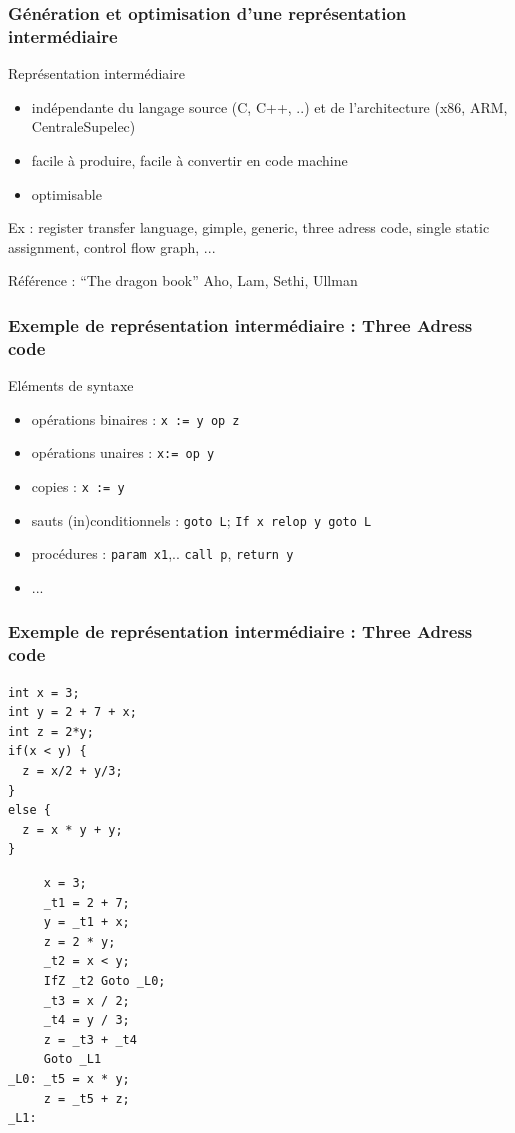 \documentclass{beamer}
\begin{document}
\begin{frame}
\frametitle{Génération et optimisation d'une représentation intermédiaire}
\begin{block}{Représentation intermédiaire}
\begin{itemize}
\item indépendante du langage source (C, C++, ..) et de l'architecture (x86, ARM, CentraleSupelec)
\item facile à produire, facile à convertir en code machine
\item optimisable
\end{itemize}
Ex : register transfer language, gimple, generic, three adress code, single static assignment, control flow graph, ...
\end{block}
\vfill
Référence : ``The dragon book'' Aho, Lam, Sethi, Ullman
\end{frame}

\begin{frame}
\frametitle{Exemple de représentation intermédiaire : Three Adress code}
\begin{block}{Eléments de syntaxe}
\begin{itemize}
\item opérations binaires : \texttt{x := y op z}
\item opérations unaires : \texttt{x:= op y}
\item copies : \texttt{x := y}
\item sauts (in)conditionnels : \texttt{goto L}; \texttt{If x relop y goto L}
\item procédures : \texttt{param x1},.. \texttt{call p}, \texttt{return y}
\item ...
\end{itemize}
\end{block}
\end{frame}

\begin{frame}[fragile]
\frametitle{Exemple de représentation intermédiaire : Three Adress code}

\begin{small}
\begin{minipage}[c]{0.4\linewidth}
\begin{lstlisting}
int x = 3;
int y = 2 + 7 + x;
int z = 2*y;
if(x < y) {
  z = x/2 + y/3;
}
else {
  z = x * y + y;
}
\end{lstlisting}
\end{minipage}
\begin{minipage}[c]{0.5\linewidth}
\begin{verbatim}
     x = 3;
     _t1 = 2 + 7;
     y = _t1 + x;
     z = 2 * y;
     _t2 = x < y;
     IfZ _t2 Goto _L0;
     _t3 = x / 2;
     _t4 = y / 3;
     z = _t3 + _t4
     Goto _L1
_L0: _t5 = x * y;
     z = _t5 + z;
_L1:
\end{verbatim}
\end{minipage}
\end{small}

\end{frame}
\end{document}
